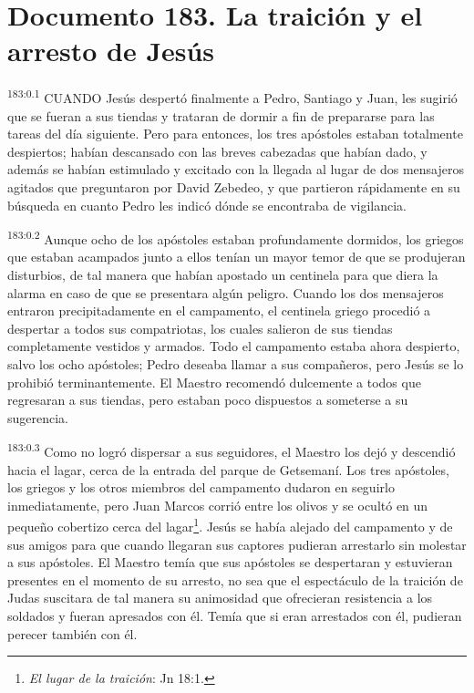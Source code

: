 \chapter{Documento 183. La traición y el arresto de Jesús}
\par
\textsuperscript{183:0.1} CUANDO Jesús despertó finalmente a Pedro, Santiago y Juan, les sugirió que se fueran a sus tiendas y trataran de dormir a fin de prepararse para las tareas del día siguiente. Pero para entonces, los tres apóstoles estaban totalmente despiertos; habían descansado con las breves cabezadas que habían dado, y además se habían estimulado y excitado con la llegada al lugar de dos mensajeros agitados que preguntaron por David Zebedeo, y que partieron rápidamente en su búsqueda en cuanto Pedro les indicó dónde se encontraba de vigilancia.

\par
\textsuperscript{183:0.2} Aunque ocho de los apóstoles estaban profundamente dormidos, los griegos que estaban acampados junto a ellos tenían un mayor temor de que se produjeran disturbios, de tal manera que habían apostado un centinela para que diera la alarma en caso de que se presentara algún peligro. Cuando los dos mensajeros entraron precipitadamente en el campamento, el centinela griego procedió a despertar a todos sus compatriotas, los cuales salieron de sus tiendas completamente vestidos y armados. Todo el campamento estaba ahora despierto, salvo los ocho apóstoles; Pedro deseaba llamar a sus compañeros, pero Jesús se lo prohibió terminantemente. El Maestro recomendó dulcemente a todos que regresaran a sus tiendas, pero estaban poco dispuestos a someterse a su sugerencia.

\par
\textsuperscript{183:0.3} Como no logró dispersar a sus seguidores, el Maestro los dejó y descendió hacia el lagar, cerca de la entrada del parque de Getsemaní. Los tres apóstoles, los griegos y los otros miembros del campamento dudaron en seguirlo inmediatamente, pero Juan Marcos corrió entre los olivos y se ocultó en un pequeño cobertizo cerca del lagar\footnote{\textit{El lugar de la traición}: Jn 18:1.}. Jesús se había alejado del campamento y de sus amigos para que cuando llegaran sus captores pudieran arrestarlo sin molestar a sus apóstoles. El Maestro temía que sus apóstoles se despertaran y estuvieran presentes en el momento de su arresto, no sea que el espectáculo de la traición de Judas suscitara de tal manera su animosidad que ofrecieran resistencia a los soldados y fueran apresados con él. Temía que si eran arrestados con él, pudieran perecer también con él.

